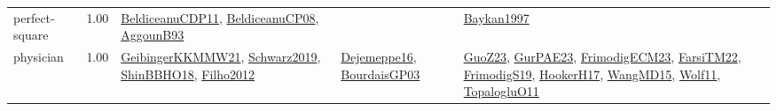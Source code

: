 {\begin{longtable}{p{3cm}r>{\raggedright\arraybackslash}p{6cm}>{\raggedright\arraybackslash}p{6cm}>{\raggedright\arraybackslash}p{8cm}}
\index{perfect-square}\index{ApplicationAreas!perfect-square}perfect-square &  1.00 & \hyperref[detail:BeldiceanuCDP11]{BeldiceanuCDP11}, \hyperref[detail:BeldiceanuCP08]{BeldiceanuCP08}, \hyperref[detail:AggounB93]{AggounB93} &  & \hyperref[detail:Baykan1997]{Baykan1997}\\
\index{physician}\index{ApplicationAreas!physician}physician &  1.00 & \hyperref[detail:GeibingerKKMMW21]{GeibingerKKMMW21}, \hyperref[detail:Schwarz2019]{Schwarz2019}, \hyperref[detail:ShinBBHO18]{ShinBBHO18}, \hyperref[detail:Filho2012]{Filho2012} & \hyperref[detail:Dejemeppe16]{Dejemeppe16}, \hyperref[detail:BourdaisGP03]{BourdaisGP03} & \hyperref[detail:GuoZ23]{GuoZ23}, \hyperref[detail:GurPAE23]{GurPAE23}, \hyperref[detail:FrimodigECM23]{FrimodigECM23}, \hyperref[detail:FarsiTM22]{FarsiTM22}, \hyperref[detail:FrimodigS19]{FrimodigS19}, \hyperref[detail:HookerH17]{HookerH17}, \hyperref[detail:WangMD15]{WangMD15}, \hyperref[detail:Wolf11]{Wolf11}, \hyperref[detail:TopalogluO11]{TopalogluO11}\\

\end{longtable}}
